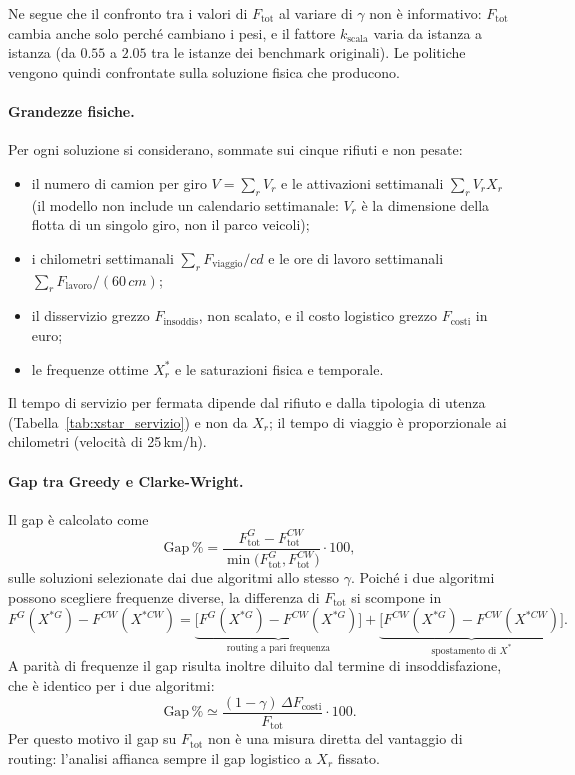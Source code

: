 Ne segue che il confronto tra i valori di $F_{\mathrm{tot}}$ al variare di $\gamma$ non è informativo: $F_{\mathrm{tot}}$ cambia anche solo perché cambiano i pesi, e il fattore $k_{\mathrm{scala}}$ varia da istanza a istanza (da $0.55$ a $2.05$ tra le istanze dei benchmark originali). Le politiche vengono quindi confrontate sulla soluzione fisica che producono.

\paragraph{Grandezze fisiche.}
Per ogni soluzione si considerano, sommate sui cinque rifiuti e non pesate:
{\sloppy
	\begin{itemize}
		\item il numero di camion per giro $V=\sum_r V_r$ e le attivazioni settimanali $\sum_r V_r X_r$ (il modello non include un calendario settimanale: $V_r$ è la dimensione della flotta di un singolo giro, non il parco veicoli);
		\item i chilometri settimanali $\sum_r F_{\mathrm{viaggio}}/cd$ e le ore di lavoro settimanali $\sum_r F_{\mathrm{lavoro}}/(60\,cm)$;
		\item il disservizio grezzo $F_{\mathrm{insoddis}}$, non scalato, e il costo logistico grezzo $F_{\mathrm{costi}}$ in euro;
		\item le frequenze ottime $X_r^*$ e le saturazioni fisica e temporale.
	\end{itemize}
	\par}
Il tempo di servizio per fermata dipende dal rifiuto e dalla tipologia di utenza (Tabella~\ref{tab:xstar_servizio}) e non da $X_r$; il tempo di viaggio è proporzionale ai chilometri (velocità di 25\,km/h).

\paragraph{Gap tra Greedy e Clarke-Wright.}
Il gap è calcolato come
\begin{equation}
	\text{Gap}\,\% = \frac{F^{G}_{\mathrm{tot}}-F^{CW}_{\mathrm{tot}}}{\min\!\bigl(F^{G}_{\mathrm{tot}},F^{CW}_{\mathrm{tot}}\bigr)}\cdot 100,
\end{equation}
sulle soluzioni selezionate dai due algoritmi allo stesso $\gamma$. Poiché i due algoritmi possono scegliere frequenze diverse, la differenza di $F_{\mathrm{tot}}$ si scompone in
\begin{equation}
	F^{G}(X^{*G})-F^{CW}(X^{*CW}) = \underbrace{\bigl[F^{G}(X^{*G})-F^{CW}(X^{*G})\bigr]}_{\text{routing a pari frequenza}} + \underbrace{\bigl[F^{CW}(X^{*G})-F^{CW}(X^{*CW})\bigr]}_{\text{spostamento di }X^*}.
\end{equation}
A parità di frequenze il gap risulta inoltre diluito dal termine di insoddisfazione, che è identico per i due algoritmi:
\begin{equation}
	\text{Gap}\,\% \simeq \frac{(1-\gamma)\,\Delta F_{\mathrm{costi}}}{F_{\mathrm{tot}}}\cdot 100 .
\end{equation}
Per questo motivo il gap su $F_{\mathrm{tot}}$ non è una misura diretta del vantaggio di routing: l'analisi affianca sempre il gap logistico a $X_r$ fissato.

